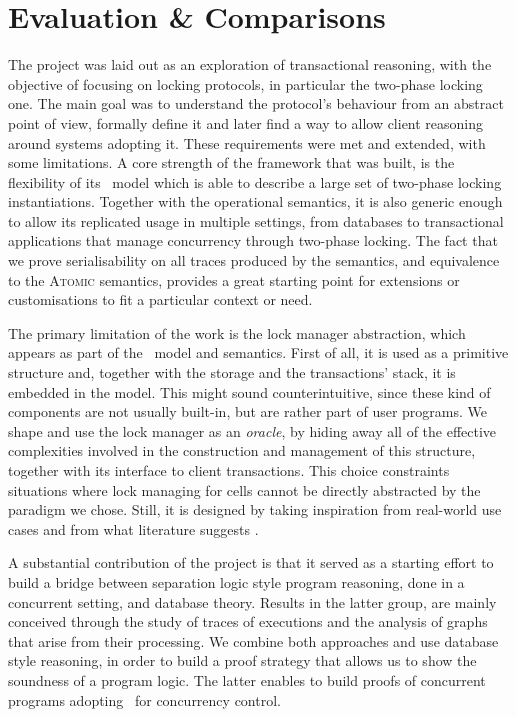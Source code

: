 \section{Evaluation \& Comparisons}

The project was laid out as an exploration of transactional reasoning, with the objective of focusing on locking protocols, in particular the two-phase locking one. The main goal was to understand the protocol's behaviour from an abstract point of view, formally define it and later find a way to allow client reasoning around systems adopting it. These requirements were met and extended, with some limitations. A core strength of the framework that was built, is the flexibility of its \tpl\ model which is able to describe a large set of two-phase locking instantiations. Together with the operational semantics, it is also generic enough to allow its replicated usage in multiple settings, from databases to transactional applications that manage concurrency through two-phase locking. The fact that we prove serialisability on all traces produced by the semantics, and equivalence to the \textsc{Atomic} semantics, provides a great starting point for extensions or customisations to fit a particular context or need.

The primary limitation of the work is the lock manager abstraction, which appears as part of the \tpl\ model and semantics. First of all, it is used as a primitive structure and, together with the storage and the transactions' stack, it is embedded in the model. This might sound counterintuitive, since these kind of components are not usually built-in, but are rather part of user programs. We shape and use the lock manager as an \textit{oracle}, by hiding away all of the effective complexities involved in the construction and management of this structure, together with its interface to client transactions. This choice constraints situations where lock managing for cells cannot be directly abstracted by the paradigm we chose. Still, it is designed by taking inspiration from real-world use cases and from what literature suggests \cite{ccontrol}.

A substantial contribution of the project is that it served as a starting effort to build a bridge between separation logic style program reasoning, done in a concurrent setting, and database theory. Results in the latter group, are mainly conceived through the study of traces of executions and the analysis of graphs that arise from their processing. We combine both approaches and use database style reasoning, in order to build a proof strategy that allows us to show the soundness of a program logic. The latter enables to build proofs of concurrent programs adopting \tpl\ for concurrency control.

